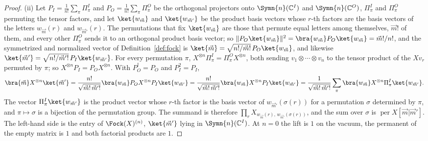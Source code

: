 \begin{proof}
(ii) Let $P_I=\frac1{n!}\sum_{\pi}\Pi^{I}_{\pi}$ and
$P_O=\frac1{n!}\sum_{\pi}\Pi^{O}_{\pi}$ be the orthogonal projectors onto
$\Symn{n}(\mathbb{C}^{I})$ and $\Symn{n}(\mathbb{C}^{O})$, $\Pi^{I}_{\pi}$ and
$\Pi^{O}_{\pi}$ permuting the tensor factors, and let $\ket{w_{\vec m}}$ and
$\ket{w_{\vec m'}}$ be the product basis vectors whose $r$-th factors are the
basis vectors of the letters $w_{\vec m}(r)$ and $w_{\vec m'}(r)$. The
permutations that fix $\ket{w_{\vec m}}$ are those that permute equal letters
among themselves, $\vec m!$ of them, and every other $\Pi^{O}_{\pi}$ sends it
to an orthogonal product basis vector; so
$\lVert P_O\ket{w_{\vec m}}\rVert^{2}=\bra{w_{\vec m}}P_O\ket{w_{\vec m}}
=\vec m!/n!$, and the symmetrized and normalized vector of
Definition~\ref{def:fock} is
$\ket{\vec m}=\sqrt{n!/\vec m!}\,P_O\ket{w_{\vec m}}$, and likewise
$\ket{\vec m'}=\sqrt{n!/\vec m'!}\,P_I\ket{w_{\vec m'}}$. For every
permutation $\pi$, $X^{\otimes n}\Pi^{I}_{\pi}=\Pi^{O}_{\pi}X^{\otimes n}$,
both sending $v_1\otimes\cdots\otimes v_n$ to the tensor product of the
$Xv_r$ permuted by $\pi$; so $X^{\otimes n}P_I=P_OX^{\otimes n}$. With
$P_O^{\dagger}=P_O$ and $P_I^{2}=P_I$,
\begin{equation*}
  \bra{\vec m}X^{\otimes n}\ket{\vec m'}
  =\frac{n!}{\sqrt{\vec m!\,\vec m'!}}
   \bra{w_{\vec m}}P_OX^{\otimes n}P_I\ket{w_{\vec m'}}
  =\frac{n!}{\sqrt{\vec m!\,\vec m'!}}
   \bra{w_{\vec m}}X^{\otimes n}P_I\ket{w_{\vec m'}}
  =\frac{1}{\sqrt{\vec m!\,\vec m'!}}\sum_{\pi}
   \bra{w_{\vec m}}X^{\otimes n}\Pi^{I}_{\pi}\ket{w_{\vec m'}} .
\end{equation*}
The vector $\Pi^{I}_{\pi}\ket{w_{\vec m'}}$ is the product vector whose $r$-th
factor is the basis vector of $w_{\vec m'}(\sigma(r))$ for a permutation
$\sigma$ determined by $\pi$, and $\pi\mapsto\sigma$ is a bijection of the
permutation group. The summand is therefore
$\prod_{r}X_{w_{\vec m}(r),\,w_{\vec m'}(\sigma(r))}$, and the sum over
$\sigma$ is $\operatorname{per}X[\vec m|\vec m']$. The left-hand side is the
entry of $\Fock(X)^{(n)}$, $\ket{\vec m'}$ lying in
$\Symn{n}(\mathbb{C}^{I})$. At $n=0$ the lift is $1$ on the vacuum, the
permanent of the empty matrix is $1$ and both factorial products are $1$.
\end{proof}
